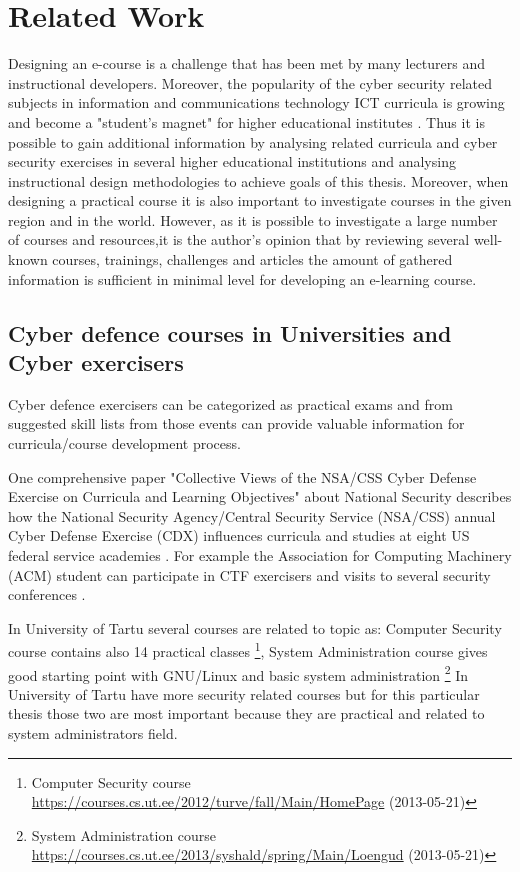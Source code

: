 \section{Related Work}
\label{Related Work}
Designing an e-course is a challenge that has been met by many lecturers and instructional developers. Moreover, the popularity of the cyber security related subjects in information and communications technology ICT curricula is growing and become a "student’s magnet" for higher educational institutes \citep{CyberIsHot}. Thus it is possible to gain additional information by analysing related curricula and cyber security exercises  in several higher educational institutions and analysing instructional design methodologies to achieve goals of this thesis. Moreover, when designing a practical course it is also important to investigate courses in the given region and in the world. However, as it is possible to investigate a large number of courses and resources,it is the author’s opinion that by reviewing several well-known courses, trainings, challenges and articles the amount of gathered information is sufficient in minimal level for developing an e-learning course.


\subsection{Cyber defence courses in Universities and Cyber exercisers}
Cyber defence exercisers can be categorized as practical exams and from suggested skill lists from those events can provide valuable information for curricula/course development process.

One comprehensive paper "Collective Views of the NSA/CSS Cyber Defense Exercise
on Curricula and Learning Objectives" about National Security describes how the National Security
Agency/Central Security Service (NSA/CSS) annual Cyber Defense Exercise (\gls{CDX}) influences curricula and studies at eight US federal service academies \citep{adams_CDX_curricula}. For example the Association for Computing Machinery (ACM) student can participate in \gls{CTF} exercisers and  visits to several security conferences \citep{adams_CDX_curricula}.

In University of Tartu several courses are related to topic as: Computer Security course  contains also 14 practical classes \footnote{Computer Security course   \url{https://courses.cs.ut.ee/2012/turve/fall/Main/HomePage} (2013-05-21)}, System Administration course gives good starting point with GNU/Linux and basic system administration \footnote{ System Administration course  \url{https://courses.cs.ut.ee/2013/syshald/spring/Main/Loengud} (2013-05-21)}
In University of Tartu have more security related courses but for this particular thesis those two are most important because they are practical and related to system administrators field.


